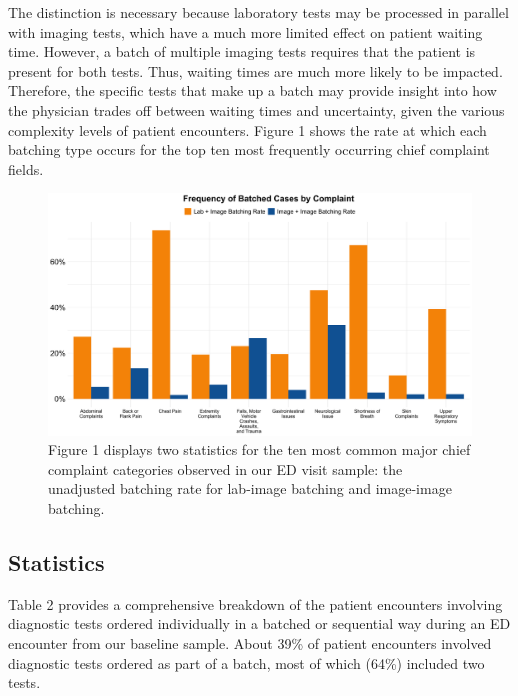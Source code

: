 \documentclass[,,nonblindrev]{informs}
\begin{document}
The distinction is necessary because laboratory tests may be processed
in parallel with imaging tests, which have a much more limited effect on
patient waiting time. However, a batch of multiple imaging tests
requires that the patient is present for both tests. Thus, waiting times
are much more likely to be impacted. Therefore, the specific tests that
make up a batch may provide insight into how the physician trades off
between waiting times and uncertainty, given the various complexity
levels of patient encounters. Figure 1 shows the rate at which each
batching type occurs for the top ten most frequently occurring chief
complaint fields.

\begin{figure}[h]
  \centering
  \includegraphics[width=1\textwidth]{../manuscript/figures/frequency_batches.png}
  \tiny
  \caption{Figure 1 displays two statistics for the ten most common major chief complaint categories observed in our ED visit sample: the unadjusted batching rate for lab-image batching and image-image batching.}
\end{figure}

\hypertarget{statistics}{%
\subsection{Statistics}\label{statistics}}

Table 2 provides a comprehensive breakdown of the patient encounters
involving diagnostic tests ordered individually in a batched or
sequential way during an ED encounter from our baseline sample. About
39\% of patient encounters involved diagnostic tests ordered as part of
a batch, most of which (64\%) included two tests.
\end{document}
